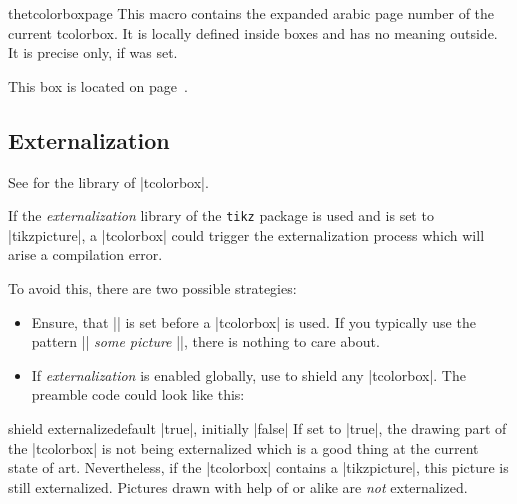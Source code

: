 \begin{docCommand}[doc new=2015-11-13]{thetcolorboxpage}{}
This macro contains the expanded arabic page number of the current tcolorbox.
It is locally defined inside boxes and has no meaning outside.
It is precise only, if  was set.

\begin{dispExample}
\begin{tcolorbox}[colback=yellow!5,check odd page,
    title=Box on page~\thetcolorboxpage]
  This box is located on page~\thetcolorboxpage.
\end{tcolorbox}
\end{dispExample}
\end{docCommand}





\clearpage
\subsection{Externalization}
\begin{marker}
See  for the  library of |tcolorbox|.
\end{marker}

If the \emph{externalization} library of the \texttt{tikz} package is used
and  is set to |tikzpicture|,
a |tcolorbox| could trigger the externalization process which will arise
a compilation error.

To avoid this, there are two possible strategies:
\begin{itemize}
\item Ensure, that |\tikzexternaldisable| is set before a |tcolorbox| is used.
  If you typically use the pattern |\tikzexternalenable| \textit{some picture} |\tikzexternaldisable|,
  there is nothing to care about.
\item If \emph{externalization} is enabled globally, use  to
  shield any |tcolorbox|. The preamble code could look like this:
\begin{dispListing}
\usetikzlibrary{external}
\tikzexternalize
{}
\end{dispListing}
\end{itemize}

\begin{docTcbKey}{shield externalize}{}{default |true|, initially |false|}
If set to |true|, the drawing part of the |tcolorbox| is not being externalized
which is a good thing at the current state of art. Nevertheless, if the
|tcolorbox| contains a |tikzpicture|, this picture is still externalized.
Pictures drawn with help of  or alike are \emph{not}
externalized.
\end{docTcbKey}

